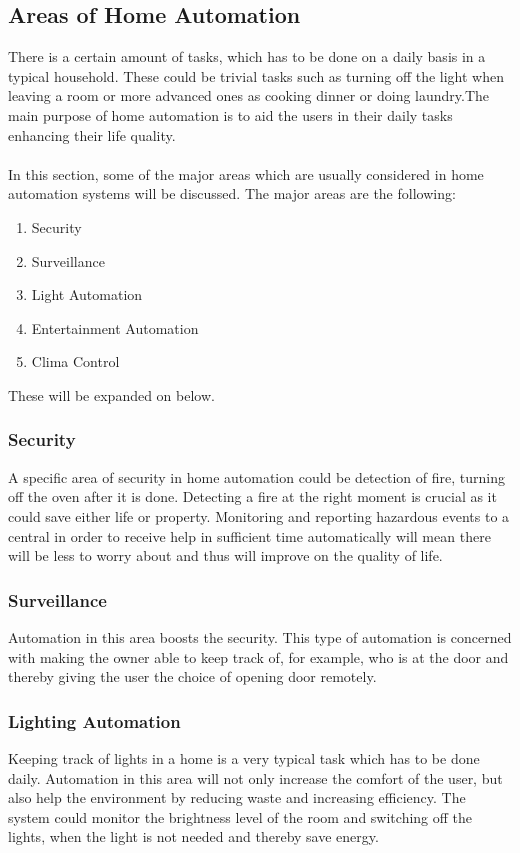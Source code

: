 \subsection{Areas of Home Automation}
\label{sec:Areas of Home Automation}
There is a certain amount of tasks, which has to be done on a daily basis in a typical household.
These could be trivial tasks such as turning off the light when leaving a room or more advanced ones as cooking dinner or
doing laundry.The main purpose of home automation is to aid the users in their daily tasks enhancing their life quality.
\\\\
In this section, some of the major areas which are usually considered in home automation systems will be discussed.
The major areas are the following:

\begin{enumerate}
  \item Security
  \item Surveillance
  \item Light Automation
  \item Entertainment Automation
  \item Clima Control
\end{enumerate}
These will be expanded on below.

\subsubsection{Security}
\label{sub:Security}
A specific area of security in home automation could be detection of fire, turning off the oven after it is done.
Detecting a fire at the right moment is crucial as it could save either life or property.
Monitoring and reporting hazardous events to a central in order to receive help in sufficient time automatically
will mean there will be less to worry about and thus will improve on the quality of life.

\subsubsection{Surveillance}
\label{sub:Surveillance}
Automation in this area boosts the security.
This type of automation is concerned with making the owner able to keep track of, for example, who is at the door and
thereby giving the user the choice of opening door remotely.

\subsubsection{Lighting Automation}
\label{sub:Lighting Automation}
Keeping track of lights in a home is a very typical task which has to be done daily.
Automation in this area will not only increase the comfort of the user, but also help the environment by reducing waste and
increasing efficiency. The system could monitor the brightness level of the room and switching off the lights,
when the light is not needed and thereby save energy.

